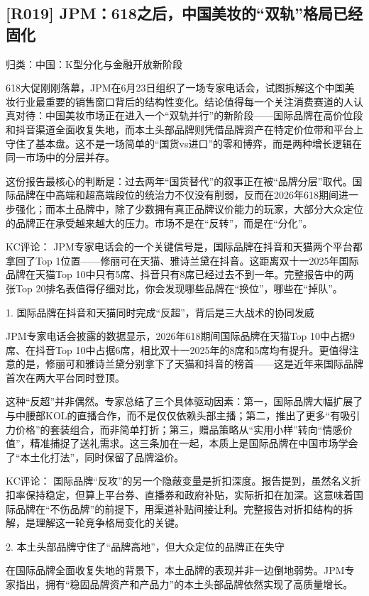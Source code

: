 \documentclass[11pt]{ctexart}
\begin{document}
\subsection{[R019] JPM：618之后，中国美妆的“双轨”格局已经固化}
{\small\color{refgray}归类：中国：K型分化与金融开放新阶段}

618大促刚刚落幕，JPM在6月23日组织了一场专家电话会，试图拆解这个中国美妆行业最重要的销售窗口背后的结构性变化。结论值得每一个关注消费赛道的人认真对待：中国美妆市场正在进入一个“双轨并行”的新阶段——国际品牌在高价位段和抖音渠道全面收复失地，而本土头部品牌则凭借品牌资产在特定价位带和平台上守住了基本盘。这不是一场简单的“国货vs进口”的零和博弈，而是两种增长逻辑在同一市场中的分层并存。

这份报告最核心的判断是：过去两年“国货替代”的叙事正在被“品牌分层”取代。国际品牌在中高端和超高端段位的统治力不仅没有削弱，反而在2026年618期间进一步强化；而本土品牌中，除了少数拥有真正品牌议价能力的玩家，大部分大众定位的品牌正在承受越来越大的压力。市场不是在“反转”，而是在“分化”。

KC评论： JPM专家电话会的一个关键信号是，国际品牌在抖音和天猫两个平台都拿回了Top 1位置——修丽可在天猫、雅诗兰黛在抖音。这距离双十一2025年国际品牌在天猫Top 10中只有5席、抖音只有8席已经过去不到一年。完整报告中的两张Top 20排名表值得仔细对比，你会发现哪些品牌在“换位”，哪些在“掉队”。

1. 国际品牌在抖音和天猫同时完成“反超”，背后是三大战术的协同发威

JPM专家电话会披露的数据显示，2026年618期间国际品牌在天猫Top 10中占据9席、在抖音Top 10中占据6席，相比双十一2025年的8席和5席均有提升。更值得注意的是，修丽可和雅诗兰黛分别拿下了天猫和抖音的榜首——这是近年来国际品牌首次在两大平台同时登顶。

这种“反超”并非偶然。专家总结了三个具体驱动因素：第一，国际品牌大幅扩展了与中腰部KOL的直播合作，而不是仅仅依赖头部主播；第二，推出了更多“有吸引力价格”的套装组合，而非简单打折；第三，赠品策略从“实用小样”转向“情感价值”，精准捕捉了送礼需求。这三条加在一起，本质上是国际品牌在中国市场学会了“本土化打法”，同时保留了品牌溢价。

KC评论： 国际品牌“反攻”的另一个隐蔽变量是折扣深度。报告提到，虽然名义折扣率保持稳定，但算上平台券、直播券和政府补贴，实际折扣在加深。这意味着国际品牌在“不伤品牌”的前提下，用渠道补贴间接让利。完整报告对折扣结构的拆解，是理解这一轮竞争格局变化的关键。

2. 本土头部品牌守住了“品牌高地”，但大众定位的品牌正在失守

在国际品牌全面收复失地的背景下，本土品牌的表现并非一边倒地弱势。JPM专家指出，拥有“稳固品牌资产和产品力”的本土头部品牌依然实现了高质量增长。
\end{document}
